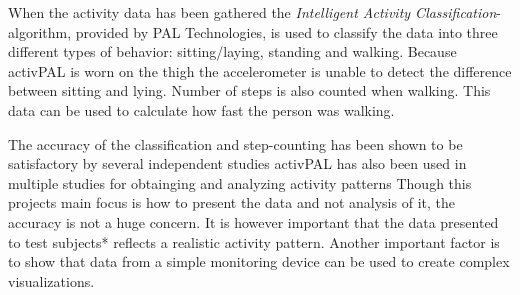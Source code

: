 When the activity data has been gathered the \emph{Intelligent Activity Classification}-algorithm, provided by PAL Technologies, is used to classify the data into three different types of behavior: sitting/laying, standing and walking. Because activPAL is worn on the thigh the accelerometer is unable to detect the difference between sitting and lying. Number of steps is also counted when walking. This data can be used to calculate how fast the person was walking.

The accuracy of the classification and step-counting has been shown to be satisfactory by several independent studies %
activPAL has also been used in multiple studies for obtainging and analyzing activity patterns %
Though this projects main focus is how to present the data and not analysis of it, the accuracy is not a huge concern. It is however important that the data presented to test subjects* reflects a realistic activity pattern. Another important factor is to show that data from a simple monitoring device can be used to create complex visualizations.
